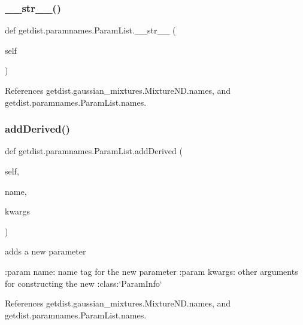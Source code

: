 \subsubsection{\texorpdfstring{\+\_\+\+\_\+str\+\_\+\+\_\+()}{\_\_str\_\_()}}
{\footnotesize\ttfamily def getdist.\+paramnames.\+Param\+List.\+\_\+\+\_\+str\+\_\+\+\_\+ (\begin{DoxyParamCaption}\item[{}]{self }\end{DoxyParamCaption})}



References getdist.\+gaussian\+\_\+mixtures.\+Mixture\+N\+D.\+names, and getdist.\+paramnames.\+Param\+List.\+names.

\mbox{\label{classgetdist_1_1paramnames_1_1ParamList_ae0b3e03a0f2f485e7cc2dca1c8b7864e}} 
\subsubsection{\texorpdfstring{add\+Derived()}{addDerived()}}
{\footnotesize\ttfamily def getdist.\+paramnames.\+Param\+List.\+add\+Derived (\begin{DoxyParamCaption}\item[{}]{self,  }\item[{}]{name,  }\item[{}]{kwargs }\end{DoxyParamCaption})}

\begin{DoxyVerb}adds a new parameter

:param name: name tag for the new parameter
:param kwargs: other arguments for constructing the new :class:`ParamInfo`
\end{DoxyVerb}
 

References getdist.\+gaussian\+\_\+mixtures.\+Mixture\+N\+D.\+names, and getdist.\+paramnames.\+Param\+List.\+names.

\mbox{\label{classgetdist_1_1paramnames_1_1ParamList_ace8728a95682cb04e0c137b9b7d6fd7e}} 
